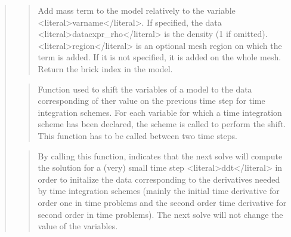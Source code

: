 \documentclass[a4paper,11pt,english]{sphinxmanual}
\begin{document}
\begin{quote}
\sphinxAtStartPar
{}
\begin{quote}

\sphinxAtStartPar
Add mass term to the model relatively to the variable \textless{}literal\textgreater{}varname\textless{}/literal\textgreater{}.
If specified, the data \textless{}literal\textgreater{}dataexpr\_rho\textless{}/literal\textgreater{} is the
density (1 if omitted). \textless{}literal\textgreater{}region\textless{}/literal\textgreater{} is an optional mesh region on
which the term is added. If it is not specified, it
is added on the whole mesh. Return the brick index in the model.
\end{quote}

\sphinxAtStartPar
{}
\begin{quote}

\sphinxAtStartPar
Function used to shift the variables of a model to the data
corresponding of ther value on the previous time step for time
integration schemes. For each variable for which a time integration
scheme has been declared, the scheme is called to perform the shift.
This function has to be called between two time steps.
\end{quote}

\sphinxAtStartPar
{}
\begin{quote}

\sphinxAtStartPar
By calling this function, indicates that the next solve will compute
the solution for a (very) small time step \textless{}literal\textgreater{}ddt\textless{}/literal\textgreater{} in order to initalize
the data corresponding to the derivatives needed by time integration
schemes (mainly the initial time derivative for order one in time
problems  and the second order time derivative for second order in time
problems). The next solve will not change the value of the variables.
\end{quote}

\sphinxAtStartPar
{}
\begin{quote}


\end{quote}
\end{quote}
\end{document}
